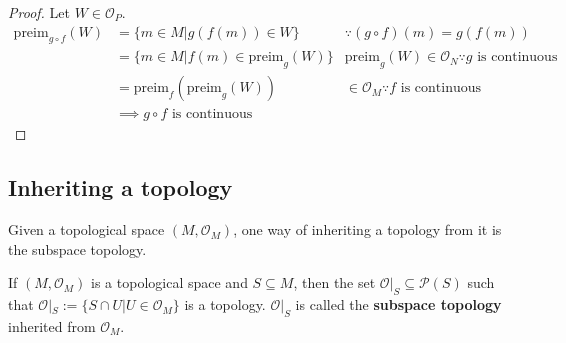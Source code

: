 \begin{proof}
Let $W \in \mathcal{O}_{P}$. 
\begin{align*}
\text{preim}_{g \circ f}(W) &= \lbrace m \in M | g(f(m)) \in W \rbrace &\because (g \circ f)(m) = g(f(m)) \\
&= \lbrace m \in M | f(m) \in \text{preim}_{g}(W) \rbrace & \text{preim}_{g}(W) \in \mathcal{O}_{N} \because g \text{ is continuous} \\
&= \text{preim}_{f}(\text{preim}_{g}(W)) &\in \mathcal{O}_{M} \because f \text{ is continuous} \\
&\implies g \circ f \text{ is continuous}
\end{align*}

\end{proof}

\subsection{Inheriting a topology}

Given a topological space $(M, \mathcal{O}_{M})$, one way of inheriting a topology from it is the subspace topology.

\begin{theorem}
If $(M, \mathcal{O}_{M})$ is a topological space and $S \subseteq M$, then the set $\mathcal{O}|_S \subseteq \mathcal{P}(S)$ such that $\mathcal{O}|_S := \lbrace S \cap U | U \in \mathcal{O}_{M} \rbrace$ is a topology. $\mathcal{O}|_S$ is called the \textbf{subspace topology} inherited from $\mathcal{O}_{M}$.
\end{theorem}

